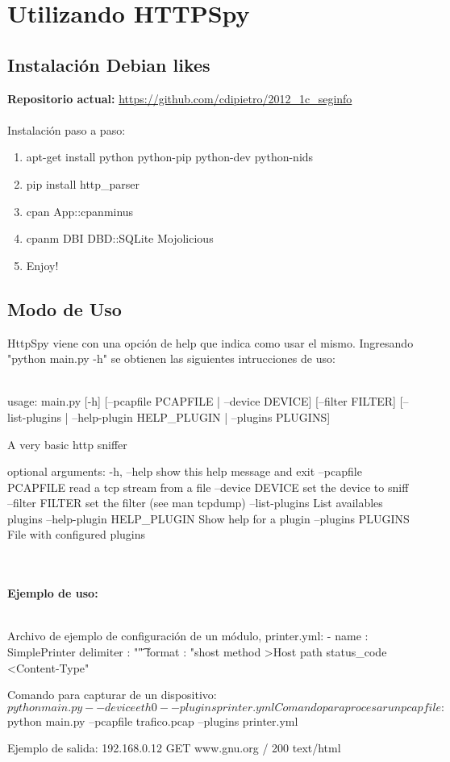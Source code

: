 \section{Utilizando HTTPSpy}

\subsection{Instalación Debian likes}

\textbf{Repositorio actual:} \url{https://github.com/cdipietro/2012\_1c\_seginfo}	
\\
\\\indent Instalación paso a paso:
\begin{enumerate}
	\item apt-get install python python-pip python-dev python-nids
	\item pip install http\_parser
	\item cpan App::cpanminus
	\item cpanm DBI DBD::SQLite Mojolicious
	\item Enjoy!
\end{enumerate}

\subsection{Modo de Uso}

HttpSpy viene con una opción de help que indica como usar el mismo. Ingresando "python main.py -h" se obtienen las siguientes intrucciones de uso:
\\\\
	{\small
	\begin{boxedverbatim}
	usage: main.py [-h] [--pcapfile PCAPFILE | --device DEVICE] 
	[--filter FILTER]
	[--list-plugins | --help-plugin HELP_PLUGIN | --plugins PLUGINS]

A very basic http sniffer

optional arguments:
  -h, --help            show this help message and exit
  --pcapfile PCAPFILE   read a tcp stream from a file
  --device DEVICE       set the device to sniff
  --filter FILTER       set the filter (see man tcpdump)
  --list-plugins        List availables plugins
  --help-plugin HELP_PLUGIN
                        Show help for a plugin
  --plugins PLUGINS     File with configured plugins
	\end{boxedverbatim}
	}
\\\\
\textbf{Ejemplo de uso:}
\\\\
{\small
\begin{boxedverbatim}
Archivo de ejemplo de configuración de un módulo, printer.yml:
	- name      : SimplePrinter
	  delimiter : "\t"
	  format    : "shost method >Host path status_code <Content-Type"

Comando para capturar de un dispositivo:
	$python main.py --device eth0 --plugins printer.yml

Comando para procesar un pcapfile:
	$python main.py --pcapfile trafico.pcap --plugins printer.yml

Ejemplo de salida:
	192.168.0.12	GET	www.gnu.org	/	200	text/html
\end{boxedverbatim}
}

